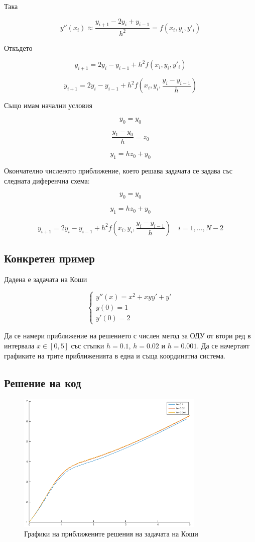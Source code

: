 \documentclass{scrartcl}
\begin{document}
Така

$$y''(x_i) \approx \dfrac{y_{i+1} - 2 y_{i} + y_{i-1}}{h^2} = f(x_i, y_i, y'_i)$$

Откъдето

$$y_{i+1} = 2y_i - y_{i-1} + h^2f(x_i, y_i, y'_i)$$

$$y_{i+1} = 2y_i - y_{i-1} + h^2f\left(x_i, y_i, \dfrac{y_i - y_{i-1}}{h}\right)$$

Също имам начални условия

$$y_0 = y_0$$

$$\dfrac{y_1 - y_{0}}{h} = z_0$$

$$y_1 = hz_0 + y_0$$

Окончателно численото приближение, което решава задачата се задава със следната диференчна схема:

$$y_0 = y_0$$

$$y_1 = hz_0 + y_0$$

$$y_{i+1} = 2y_i - y_{i-1} + h^2f\left(x_i, y_i, \dfrac{y_i - y_{i-1}}{h}\right) \quad i=1,\dots,N-2$$

\subsection{Конкретен пример}

Дадена е задачата на Коши

$$
\begin{cases}
y''(x) = x^2 + xyy' + y'\\
y(0) = 1\\
y'(0) = 2
\end{cases}
$$

Да се намери приближение на решението с числен метод за ОДУ от втори ред в интервала $x\in [0, 5]$ със стъпки $h = 0.1$, $h = 0.02$ и $h = 0.001$. Да се начертаят графиките на трите приближенията в една и съща координатна система.

\subsection{Решение на код}



\begin{figure}[H]
    \centering
    \includegraphics[width=0.8\textwidth]{numeric_method_picture.png}
    \caption{Графики на приближените решения на задачата на Коши}
    \label{fig:numeric_method_picture}
\end{figure}
\end{document}
